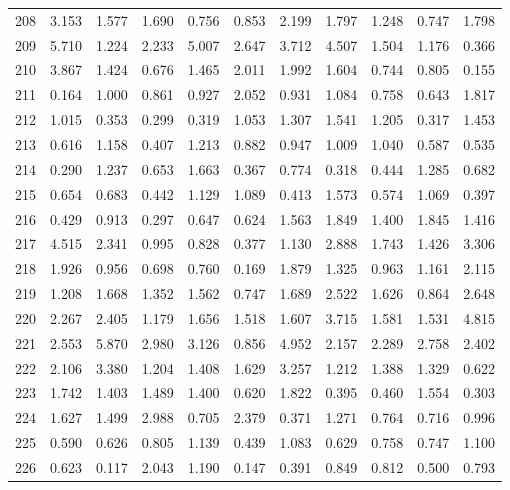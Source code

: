 \begin{tabular}{lrrrrrrrrrr}
208 &  3.153 &  1.577 &  1.690 &  0.756 &  0.853 &  2.199 &  1.797 &  1.248 &  0.747 &  1.798 \\
209 &  5.710 &  1.224 &  2.233 &  5.007 &  2.647 &  3.712 &  4.507 &  1.504 &  1.176 &  0.366 \\
210 &  3.867 &  1.424 &  0.676 &  1.465 &  2.011 &  1.992 &  1.604 &  0.744 &  0.805 &  0.155 \\
211 &  0.164 &  1.000 &  0.861 &  0.927 &  2.052 &  0.931 &  1.084 &  0.758 &  0.643 &  1.817 \\
212 &  1.015 &  0.353 &  0.299 &  0.319 &  1.053 &  1.307 &  1.541 &  1.205 &  0.317 &  1.453 \\
213 &  0.616 &  1.158 &  0.407 &  1.213 &  0.882 &  0.947 &  1.009 &  1.040 &  0.587 &  0.535 \\
214 &  0.290 &  1.237 &  0.653 &  1.663 &  0.367 &  0.774 &  0.318 &  0.444 &  1.285 &  0.682 \\
215 &  0.654 &  0.683 &  0.442 &  1.129 &  1.089 &  0.413 &  1.573 &  0.574 &  1.069 &  0.397 \\
216 &  0.429 &  0.913 &  0.297 &  0.647 &  0.624 &  1.563 &  1.849 &  1.400 &  1.845 &  1.416 \\
217 &  4.515 &  2.341 &  0.995 &  0.828 &  0.377 &  1.130 &  2.888 &  1.743 &  1.426 &  3.306 \\
218 &  1.926 &  0.956 &  0.698 &  0.760 &  0.169 &  1.879 &  1.325 &  0.963 &  1.161 &  2.115 \\
219 &  1.208 &  1.668 &  1.352 &  1.562 &  0.747 &  1.689 &  2.522 &  1.626 &  0.864 &  2.648 \\
220 &  2.267 &  2.405 &  1.179 &  1.656 &  1.518 &  1.607 &  3.715 &  1.581 &  1.531 &  4.815 \\
221 &  2.553 &  5.870 &  2.980 &  3.126 &  0.856 &  4.952 &  2.157 &  2.289 &  2.758 &  2.402 \\
222 &  2.106 &  3.380 &  1.204 &  1.408 &  1.629 &  3.257 &  1.212 &  1.388 &  1.329 &  0.622 \\
223 &  1.742 &  1.403 &  1.489 &  1.400 &  0.620 &  1.822 &  0.395 &  0.460 &  1.554 &  0.303 \\
224 &  1.627 &  1.499 &  2.988 &  0.705 &  2.379 &  0.371 &  1.271 &  0.764 &  0.716 &  0.996 \\
225 &  0.590 &  0.626 &  0.805 &  1.139 &  0.439 &  1.083 &  0.629 &  0.758 &  0.747 &  1.100 \\
226 &  0.623 &  0.117 &  2.043 &  1.190 &  0.147 &  0.391 &  0.849 &  0.812 &  0.500 &  0.793 \\

\end{tabular}
